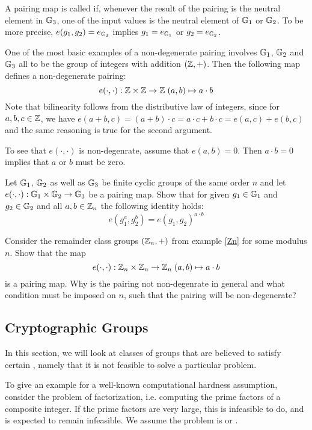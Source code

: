 A pairing map is called  if, whenever the result of the pairing is the neutral element in $\mathbb{G}_3$, one of the input values is the neutral element of $\mathbb{G}_1$ or $\mathbb{G}_2$. To be more precise, $e(g_1,g_2)=e_{\mathbb{G}_3}$ implies $g_1=e_{\mathbb{G}_1}$ or $g_2=e_{\mathbb{G}_2}$.
\begin{example}
\label{example:integer_addition_pairing}
One of the most basic examples of a non-degenerate pairing involves $\mathbb{G}_1$, $\mathbb{G}_2$ and $\mathbb{G}_3$ all to be the group of integers with addition $(\mathbb{Z},+)$. Then the following map defines a non-degenerate pairing:
$$
e(\cdot,\cdot): \mathbb{Z} \times \mathbb{Z} \to \mathbb{Z} \; (a,b)\mapsto a\cdot b
$$
Note that bilinearity follows from the distributive law of integers, since for $a,b,c\in \mathbb{Z}$, we have $e(a+b,c)=(a+b)\cdot c = a\cdot c + b\cdot c = e(a,c)+ e(b,c)$ and the same reasoning is true for the second argument.

To see that $e(\cdot,\cdot)$ is non-degenrate, assume that $e(a,b)=0$. Then $a\cdot b =0$ implies that $a$ or $b$ must be zero.
\end{example}
\begin{exercise} Let $\mathbb{G}_1$, $\mathbb{G}_2$ as well as $\mathbb{G}_3$ be finite cyclic groups of the same order $n$ and let $e(\cdot,\cdot): \mathbb{G}_1 \times \mathbb{G}_2 \to \mathbb{G}_3$ be a pairing map. Show that for given $g_1\in \mathbb{G}_1$ and $g_2\in \mathbb{G}_2$ and all $a,b\in \mathbb{Z}_n$ the following identity holds:
\begin{equation}
e(g_1^a, g_2^b) = e(g_1,g_2)^{a\cdot b}
\end{equation}
\end{exercise}
\begin{exercise} Consider the remainder class groups $(\mathbb{Z}_n,+)$ from example \ref{Zn} for some modulus $n$. Show that the map
$$
e(\cdot,\cdot): \mathbb{Z}_n \times \mathbb{Z}_n \to \mathbb{Z}_n \; (a,b)\mapsto a\cdot b
$$
is a pairing map. Why is the pairing not non-degenrate in general and what condition must be imposed on $n$, such that the pairing will be non-degenerate?
\end{exercise}

\subsection{Cryptographic Groups}
\label{crypto_groups} In this section, we will look at classes of groups that are believed to satisfy certain , namely that it is not feasible to solve a particular problem. 

\begin{example}

To give an example for a well-known computational hardness assumption, consider the problem of factorization, i.e. computing the prime factors of a composite integer. If the prime factors are very large, this is infeasible to do, and is expected to remain infeasible. We assume the problem is  or .

\end{example}

